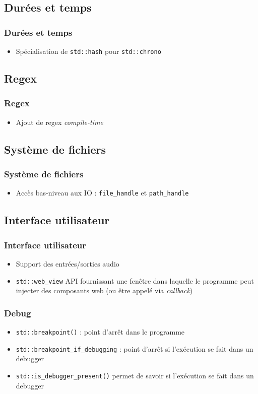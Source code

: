 \documentclass[C++.tex]{subfiles}
\begin{document}
\subsection*{Durées et temps}
\begin{frame}[fragile]
	\frametitle{Durées et temps}
	\begin{itemize}
		\item Spécialisation de \lstinline|std::hash| pour \lstinline|std::chrono|
	\end{itemize}
\end{frame}

\subsection*{Regex}
\begin{frame}[fragile]
	\frametitle{Regex}
	\begin{itemize}
		\item Ajout de regex \textit{compile-time}
	\end{itemize}
\end{frame}

\subsection*{Système de fichiers}
\begin{frame}[fragile]
	\frametitle{Système de fichiers}
	\begin{itemize}
		\item Accès bas-niveau aux IO : \lstinline|file_handle| et \lstinline|path_handle|
	\end{itemize}
\end{frame}

\subsection*{Interface utilisateur}
\begin{frame}[fragile]
	\frametitle{Interface utilisateur}
	\begin{itemize}
		\item Support des entrées/sorties audio
		\item \lstinline|std::web_view| API fournissant une fenêtre dans laquelle le programme peut injecter des composants web (ou être appelé via \textit{callback})
	\end{itemize}
\end{frame}

\begin{frame}[fragile]
	\frametitle{Debug}
	\begin{itemize}
		\item \lstinline|std::breakpoint()| : point d'arrêt dans le programme
		\item \lstinline|std::breakpoint_if_debugging| : point d'arrêt si l'exécution se fait dans un debugger
		\item \lstinline|std::is_debugger_present()| permet de savoir si l'exécution se fait dans un debugger
	\end{itemize}
\end{frame}
\end{document}
